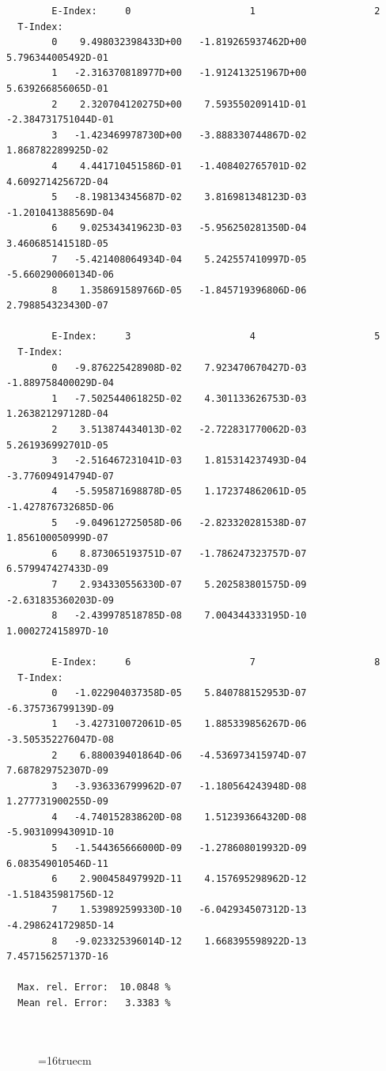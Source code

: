 \documentclass[12pt,dvips]{article}
\begin{document}
\begin{small}\begin{verbatim}
        E-Index:     0                     1                     2
  T-Index:
        0    9.498032398433D+00   -1.819265937462D+00    5.796344005492D-01
        1   -2.316370818977D+00   -1.912413251967D+00    5.639266856065D-01
        2    2.320704120275D+00    7.593550209141D-01   -2.384731751044D-01
        3   -1.423469978730D+00   -3.888330744867D-02    1.868782289925D-02
        4    4.441710451586D-01   -1.408402765701D-02    4.609271425672D-04
        5   -8.198134345687D-02    3.816981348123D-03   -1.201041388569D-04
        6    9.025343419623D-03   -5.956250281350D-04    3.460685141518D-05
        7   -5.421408064934D-04    5.242557410997D-05   -5.660290060134D-06
        8    1.358691589766D-05   -1.845719396806D-06    2.798854323430D-07

        E-Index:     3                     4                     5
  T-Index:
        0   -9.876225428908D-02    7.923470670427D-03   -1.889758400029D-04
        1   -7.502544061825D-02    4.301133626753D-03    1.263821297128D-04
        2    3.513874434013D-02   -2.722831770062D-03    5.261936992701D-05
        3   -2.516467231041D-03    1.815314237493D-04   -3.776094914794D-07
        4   -5.595871698878D-05    1.172374862061D-05   -1.427876732685D-06
        5   -9.049612725058D-06   -2.823320281538D-07    1.856100050999D-07
        6    8.873065193751D-07   -1.786247323757D-07    6.579947427433D-09
        7    2.934330556330D-07    5.202583801575D-09   -2.631835360203D-09
        8   -2.439978518785D-08    7.004344333195D-10    1.000272415897D-10

        E-Index:     6                     7                     8
  T-Index:
        0   -1.022904037358D-05    5.840788152953D-07   -6.375736799139D-09
        1   -3.427310072061D-05    1.885339856267D-06   -3.505352276047D-08
        2    6.880039401864D-06   -4.536973415974D-07    7.687829752307D-09
        3   -3.936336799962D-07   -1.180564243948D-08    1.277731900255D-09
        4   -4.740152838620D-08    1.512393664320D-08   -5.903109943091D-10
        5   -1.544365666000D-09   -1.278608019932D-09    6.083549010546D-11
        6    2.900458497992D-11    4.157695298962D-12   -1.518435981756D-12
        7    1.539892599330D-10   -6.042934507312D-13   -4.298624172985D-14
        8   -9.023325396014D-12    1.668395598922D-13    7.457156257137D-16

  Max. rel. Error:  10.0848 %
  Mean rel. Error:   3.3383 %



\end{verbatim}\end{small}
\begin{figure} \label{2.3.6il1}
\epsfxsize=16truecm
\end{figure}
\newpage
\end{document}
